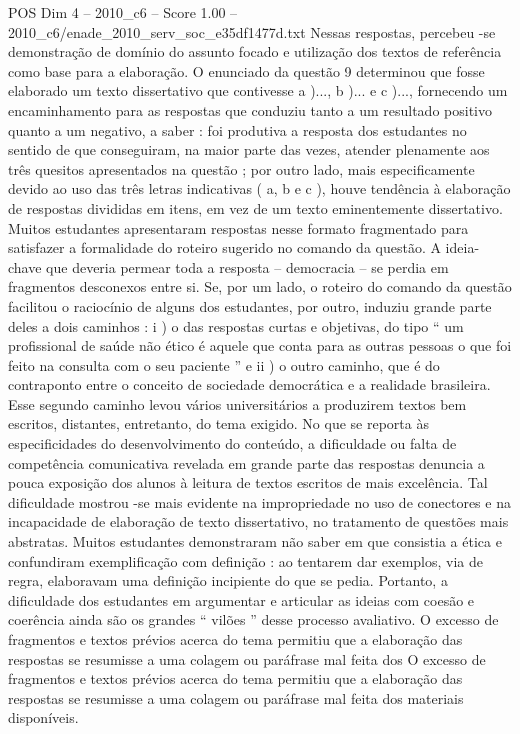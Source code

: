 \begin{textsample}{POS Dim 4 – 2010\_c6 – Score 1.00 – 2010\_c6/enade\_2010\_serv\_soc\_e35df1477d.txt}
Nessas respostas, percebeu -se demonstração de domínio do assunto focado e utilização dos textos de referência como base para a elaboração.
O enunciado da questão 9 determinou que fosse elaborado um texto dissertativo que contivesse a )..., b )... e c )..., fornecendo um encaminhamento para as respostas que conduziu tanto a um resultado positivo quanto a um negativo, a saber : foi produtiva a resposta dos estudantes no sentido de que conseguiram, na maior parte das vezes, atender plenamente aos três quesitos apresentados na questão ; por outro lado, mais especificamente devido ao uso das três letras indicativas ( a, b e c ), houve tendência à elaboração de respostas divididas em itens, em vez de um texto eminentemente dissertativo.
Muitos estudantes apresentaram respostas nesse formato fragmentado para satisfazer a formalidade do roteiro sugerido no comando da questão.
A ideia-chave que deveria permear toda a resposta – democracia – se perdia em fragmentos desconexos entre si.
Se, por um lado, o roteiro do comando da questão facilitou o raciocínio de alguns dos estudantes, por outro, induziu grande parte deles a dois caminhos : i ) o das respostas curtas e objetivas, do tipo “ um profissional de saúde não ético é aquele que conta para as outras pessoas o que foi feito na consulta com o seu paciente ” e ii ) o outro caminho, que é do contraponto entre o conceito de sociedade democrática e a realidade brasileira.
Esse segundo caminho levou vários universitários a produzirem textos bem escritos, distantes, entretanto, do tema exigido.
No que se reporta às especificidades do desenvolvimento do conteúdo, a dificuldade ou falta de competência comunicativa revelada em grande parte das respostas denuncia a pouca exposição dos alunos à leitura de textos escritos de mais excelência.
Tal dificuldade mostrou -se mais evidente na impropriedade no uso de conectores e na incapacidade de elaboração de texto dissertativo, no tratamento de questões mais abstratas.
Muitos estudantes demonstraram não saber em que consistia a ética e confundiram exemplificação com definição : ao tentarem dar exemplos, via de regra, elaboravam uma definição incipiente do que se pedia.
Portanto, a dificuldade dos estudantes em argumentar e articular as ideias com coesão e coerência ainda são os grandes “ vilões ” desse processo avaliativo.
O excesso de fragmentos e textos prévios acerca do tema permitiu que a elaboração das respostas se resumisse a uma colagem ou paráfrase mal feita dos O excesso de fragmentos e textos prévios acerca do tema permitiu que a elaboração das respostas se resumisse a uma colagem ou paráfrase mal feita dos materiais disponíveis.

\end{textsample}
